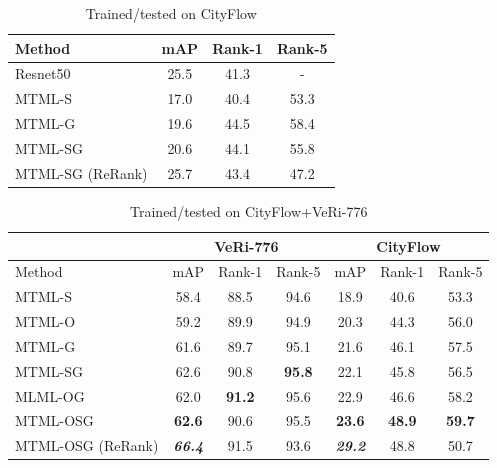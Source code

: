 \documentclass[10pt,twocolumn,letterpaper]{article}
\begin{document}
\begin{table}[h]
  \centering
  \begin{tabular}{l || c | c | c }
    \hline
    Method & mAP & Rank-1 & Rank-5 \\
    \hline
    Resnet50 \cite{tang2019cityflow} & 25.5 & 41.3 & - \\
    \hline
    MTML-S  & 17.0 & 40.4 & 53.3 \\
    MTML-G  & 19.6 & 44.5 & 58.4 \\
    \hdashline
    MTML-SG & 20.6 & 44.1 & 55.8 \\
    \hdashline
    MTML-SG (ReRank) & 25.7 & 43.4 & 47.2 \\
    \hline
  \end{tabular}
  \caption{Trained/tested on CityFlow}
  \label{T:cityflow_results}
\end{table}

\begin{table}[h]
  \centering
  \setlength{\tabcolsep}{0.05cm}
    \begin{tabular}{p{2cm}|c|c|c|c|c|c}
  \hline
  \multicolumn{1}{r|}{} & \multicolumn{3}{c|}{VeRi-776} & \multicolumn{3}{c}{CityFlow} \\
  \hline
  Method       & mAP   & Rank-1  & Rank-5  & mAP   & Rank-1 & Rank-5  \\
  \hline
  MTML-S       & 58.4  & 88.5    & 94.6    & 18.9  & 40.6   & 53.3   \\
  MTML-O       & 59.2  & 89.9    & 94.9    & 20.3  & 44.3   & 56.0   \\
  MTML-G       & 61.6  & 89.7    & 95.1    & 21.6  & 46.1   & 57.5   \\
    \hdashline
  MTML-SG      & 62.6  & 90.8    & \bf{95.8}  & 22.1  & 45.8  & 56.5   \\
  MLML-OG      & 62.0  & \bf{91.2}  & 95.6    & 22.9  & 46.6  & 58.2    \\
  MTML-OSG     & \bf{62.6}  & 90.6   & 95.5   & \bf{23.6}  & \bf{48.9}  & \bf{59.7}   \\
    \hdashline
  MTML-OSG (ReRank)   & \bf{\emph{66.4}}  & 91.5  & 93.6  & \bf{\emph{29.2}}  & 48.8 & 50.7  \\
  \hline
  \end{tabular}
  \caption{Trained/tested on CityFlow+VeRi-776}
  \label{T:cf_veri_res}
\end{table}
\end{document}
